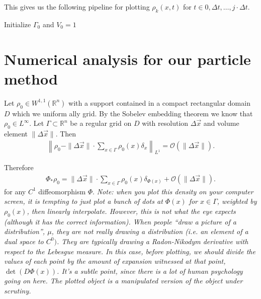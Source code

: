 \documentclass[12pt]{amsart}
\begin{document}
This gives us the following pipeline for plotting $\rho_k(x,t)$ for $t \in 0, \Delta t, \dots, j \cdot \Delta t$.
\begin{algorithm}[H]
	Initialize $\Gamma_0$ and $V_0 = 1$ \;
\end{algorithm}


\section{Numerical analysis for our particle method}

Let $\rho_0 \in W^{1,1}( \mathbb{R}^n) $ with a support contained in a compact rectangular domain $D$ which we uniform ally grid.
By the Sobelev embedding theorem we know that $\rho_0 \in L^\infty$.
Let $\Gamma \subset \mathbb{R}^n$ be a regular grid on $D$ with resolution $\Delta \vec{x}$ and volume element $ \| \Delta \vec{x} \|$.
Then
\begin{align*}
	 \left \| \rho_0 - \| \Delta \vec{x} \| \cdot \sum_{x \in \Gamma} \rho_0( x ) \delta_{x} \right \|_{L^1} = \mathcal{O}( \| \Delta \vec{x} \| ).
\end{align*}

Therefore
\begin{align*}
	\Phi_* \rho_0 = \| \Delta \vec{x} \| \cdot \sum_{x \in \Gamma} \rho_0( x ) \delta_{ \Phi(x) } + \mathcal{O}( \| \Delta \vec{x} \| ).
\end{align*}
for any $C^1$ diffeomorphism $\Phi$.
\emph{Note: when you plot this density on your computer screen, it is tempting to just plot a bunch of dots at $\Phi(x)$ for $x \in \Gamma$,
weighted by $\rho_0(x)$, then linearly interpolate.
However, this is not what the eye expects (although it has the correct information).
When people ``draw a picture of a distribution'', $\mu$, they are not really drawing a distribution (i.e. an element of a dual space to $C^0)$.
They are typically drawing a Radon-Nikodym derivative with respect to the Lebesgue measure.
In this case, before plotting, we should divide the values of each point by the amount of expansion witnessed at that point, $\det( D\Phi(x) )$.
It's a subtle point, since there is a lot of human psychology going on here.
The plotted object is a manipulated version of the object under scrutiny.}





\end{document}
